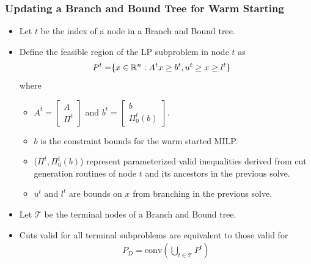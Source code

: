 \documentclass{beamer}
\begin{document}
	\begin{frame}[t]
		\frametitle{Updating a Branch and Bound Tree for Warm Starting}
		\small
		\begin{itemize}
			\item Let $ t $ be the index of a node in a Branch and Bound tree.
			\item Define the feasible region of the LP subproblem in node $ t $ as
			\begin{align*}
				P^{t} =& \{x \in \mathbb{R}^n : A^{t} x \geq b^{t}, u^{t} \geq x \geq l^{t} \}
			\end{align*}
			where
			\begin{itemize}
				\item $ A^{t} = \begin{bmatrix} A \\ \Pi^{t} \end{bmatrix}$ and $ b^{t} = \begin{bmatrix} b \\ \Pi_0^{t}(b) \end{bmatrix}$.
				\item $ b $ is the constraint bounds for the warm started MILP.
				\item ($ \Pi^{t}, \Pi_0^{t}(b) $) represent parameterized valid inequalities derived from cut generation routines of node $ t $ and its ancestors in the previous solve.
				\item $ u^{t} $ and $ l^{t} $ are bounds on $ x $ from branching in the previous solve.
			\end{itemize}
			\item Let $ \mathcal{T} $ be the terminal nodes of a Branch and Bound tree.
			\item Cuts valid for all terminal subproblems are equivalent to those valid for
			\begin{align*}
				P_D = \text{conv}(\underset{t \in \mathcal{T}}{\bigcup} P^{t})
			\end{align*}
		\end{itemize}
		\normalsize
	\end{frame}
\end{document}
